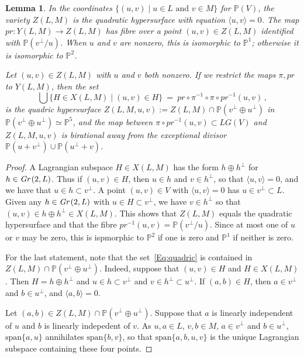 \documentclass[12pt]{amsart}
\newtheorem{Lemma}[Theorem]{Lemma}
\theoremstyle{remark}
\newcommand{\Gr}{\textit{Gr\,}}
\newcommand{\LG}{\textit{LG}}
\newcommand{\pr}{\textit{pr}}
\newcommand{\Span}{\textrm{span}}
\newcommand{\PP}{{\mathbb P}}
\begin{document}
\begin{Lemma}
  \label{L:quadrics}
  In the coordinates $\{(u,v)\mid u\in L\mbox{ and }v\in M\}$ for $\PP(V)$, the variety $Z(L,M)$ is the quadratic hypersurface with 
  equation $\langle u,v\rangle = 0$.
  The map $\pr\colon Y(L,M)\to Z(L,M)$ has fibre over a point $(u,v)\in Z(L,M)$ identified with $\PP(v^\perp/u)$.
  When $u$ and $v$ are nonzero, this is isomorphic to $\PP^1$; otherwise it is isomorphic to $\PP^2$.
  
  Let $(u,v)\in Z(L,M)$ with $u$ and $v$ both nonzero.
  If we restrict the maps $\pi,\pr$ to $Y(L,M)$, then the set
%
  \begin{equation}
  \label{Eq:quadric}
     \bigcup\{ H\in X(L,M)\mid (u,v)\in H\}\ =\ \pr \circ \pi^{-1} \circ \pi \circ \pr^{-1}(u,v)\,,
  \end{equation}
%
  is the quadric hypersurface $Z(L,M,u,v):=Z(L,M)\cap \PP(v^\perp\oplus u^\perp)$ in $\PP(v^\perp\oplus u^\perp)\simeq\PP^5$, and the map
  between $\pi \circ \pr^{-1}(u,v) \subset\LG(V)$ and $Z(L,M,u,v)$ is birational away from the exceptional divisor
  $\PP(u + v^\perp) \cup \PP(u^\perp+v)$.
\end{Lemma}
\begin{proof}
  A Lagrangian subspace $H\in X(L,M)$ has the form $h\oplus h^\perp$ for $h\in\Gr(2,L)$.
  Thus if $(u,v)\in H$, then $u\in h$ and $v\in h^\perp$, so that $\langle u,v\rangle=0$,
  and we have that $u\in h\subset v^\perp$.
  A point $(u,v)\in V$ with  $\langle u,v\rangle=0$ has $u\in v^\perp \subset L$.
  Given any $h\in\Gr(2,L)$ with $u\in H\subset v^\perp$, we have $v\in h^\perp$ so that
  $(u,v)\in h\oplus h^\perp \in X(L,M)$.
  This shows that $Z(L,M)$ equals the quadratic hypersurface and that the fibre $\pr^{-1}(u,v)=\PP(v^\perp/u)$.
  Since at most one of $u$ or $v$ may be zero, this is ispmorphic to $\PP^2$ if one is zero and $\PP^1$ if neither is zero.

  For the last statement, note that the set~\eqref{Eq:quadric} is contained in $Z(L,M)\cap \PP(v^\perp\oplus u^\perp)$.
  Indeed, suppose that $(u,v)\in H$ and $H\in X(L,M)$.
  Then $H=h\oplus h^\perp$ and $u\in h\subset v^\perp$ and $v\in h^\perp\subset u^\perp$.
  If $(a,b)\in H$, then $a\in v^\perp$ and $b\in u^\perp$, and $\langle a,b\rangle = 0$.
  
  Let $(a,b)\in Z(L,M)\cap \PP(v^\perp\oplus u^\perp)$.
  Suppose that $a$ is linearly independent of $u$ and $b$ is linearly indepedent of $v$.
  As $u,a\in L$, $v,b\in M$, $a\in v^\perp$ and $b\in u^\perp$,
  $\Span\{a,u\}$ annihilates $\Span\{b,v\}$, so that $\Span\{a,b,u,v\}$ is the unique Lagrangian subspace containing these four 
  points. 
\end{proof}
\end{document}
